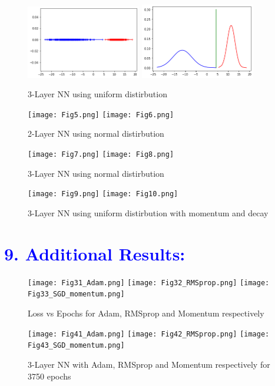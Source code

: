 \documentclass[a4paper,10pt,twoside]{article}
\begin{document}
\begin{figure}[h!]
\centering
\includegraphics[scale=1.0, width=5cm]{Fig3.png}
\includegraphics[scale=1.0, width=5cm]{Fig4.png}
\caption*{3-Layer NN using uniform distirbution}
\end{figure}

\begin{figure}[h!]
\centering
\texttt{[image: Fig5.png]}
\texttt{[image: Fig6.png]}
\caption*{2-Layer NN using normal distirbution}
\end{figure}

\begin{figure}[h!]
\centering
\texttt{[image: Fig7.png]}
\texttt{[image: Fig8.png]}
\caption*{3-Layer NN using normal distirbution}
\end{figure}

\begin{figure}[h!]
\centering
\texttt{[image: Fig9.png]}
\texttt{[image: Fig10.png]}
\caption*{3-Layer NN using uniform distirbution with momentum and decay}
\end{figure}


\newpage
\onecolumn
\section*{\textcolor{blue}{9. Additional Results:}}
\begin{figure}[h!]
\centering
\texttt{[image: Fig31\_Adam.png]}
\texttt{[image: Fig32\_RMSprop.png]}
\texttt{[image: Fig33\_SGD\_momentum.png]}
\caption*{Loss vs Epochs for Adam, RMSprop and Momentum respectively}
\end{figure}

\begin{figure}[h!]
\centering
\texttt{[image: Fig41\_Adam.png]}
\texttt{[image: Fig42\_RMSprop.png]}
\texttt{[image: Fig43\_SGD\_momentum.png]}
\caption*{3-Layer NN with Adam, RMSprop and Momentum respectively for 3750 epochs}
\end{figure}
\end{document}
